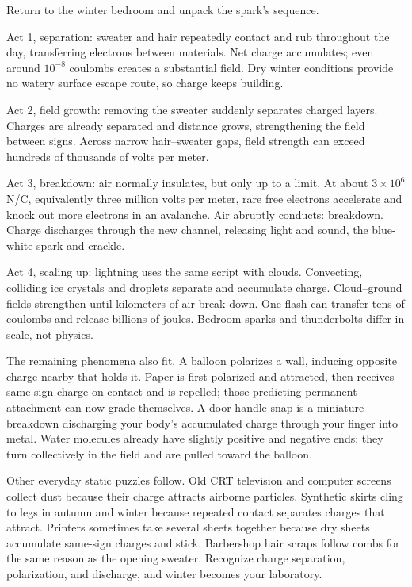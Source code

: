 
\begin{mainline}
Return to the winter bedroom and unpack the spark's sequence.

Act 1, separation: sweater and hair repeatedly contact and rub throughout the day, transferring electrons between materials. Net charge accumulates; even around \(10^{-8}\) coulombs creates a substantial field. Dry winter conditions provide no watery surface escape route, so charge keeps building.

Act 2, field growth: removing the sweater suddenly separates charged layers. Charges are already separated and distance grows, strengthening the field between signs. Across narrow hair--sweater gaps, field strength can exceed hundreds of thousands of volts per meter.

Act 3, breakdown: air normally insulates, but only up to a limit. At about \(3\times10^{6}\) N/C, equivalently three million volts per meter, rare free electrons accelerate and knock out more electrons in an avalanche. Air abruptly conducts: breakdown. Charge discharges through the new channel, releasing light and sound, the blue-white spark and crackle.

Act 4, scaling up: lightning uses the same script with clouds. Convecting, colliding ice crystals and droplets separate and accumulate charge. Cloud--ground fields strengthen until kilometers of air break down. One flash can transfer tens of coulombs and release billions of joules. Bedroom sparks and thunderbolts differ in scale, not physics.

The remaining phenomena also fit. A balloon polarizes a wall, inducing opposite charge nearby that holds it. Paper is first polarized and attracted, then receives same-sign charge on contact and is repelled; those predicting permanent attachment can now grade themselves. A door-handle snap is a miniature breakdown discharging your body's accumulated charge through your finger into metal. Water molecules already have slightly positive and negative ends; they turn collectively in the field and are pulled toward the balloon.

Other everyday static puzzles follow. Old CRT television and computer screens collect dust because their charge attracts airborne particles. Synthetic skirts cling to legs in autumn and winter because repeated contact separates charges that attract. Printers sometimes take several sheets together because dry sheets accumulate same-sign charges and stick. Barbershop hair scraps follow combs for the same reason as the opening sweater. Recognize charge separation, polarization, and discharge, and winter becomes your laboratory.


\end{mainline}
